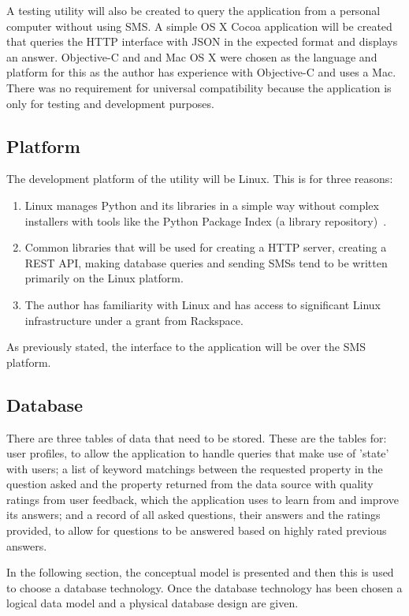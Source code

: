 \documentclass[authoryearcitations]{UoYCSproject}
\begin{document}
A testing utility will also be created to query the application from a personal computer without using SMS.  A simple OS X Cocoa application will be created that queries the HTTP interface with JSON in the expected format and displays an answer.  Objective-C and and Mac OS X were chosen as the language and platform for this as the author has experience with Objective-C and uses a Mac.  There was no requirement for universal compatibility because the application is only for testing and development purposes.

\subsection{Platform}
The development platform of the utility will be Linux.  This is for three reasons:
\begin{enumerate}
  \item Linux manages Python and its libraries in a simple way without complex installers with tools like the Python Package Index (a library repository)~\cite{pypi}.
  \item Common libraries that will be used for creating a HTTP server, creating a REST API, making database queries and sending SMSs tend to be written primarily on the Linux platform.
  \item The author has familiarity with Linux and has access to significant Linux infrastructure under a grant from Rackspace.
\end{enumerate}

As previously stated, the interface to the application will be over the SMS platform.

\subsection{Database}
There are three tables of data that need to be stored.  These are the tables for: user profiles, to allow the application to handle queries that make use of 'state' with users; a list of keyword matchings between the requested property in the question asked and the property returned from the data source with quality ratings from user feedback, which the application uses to learn from and improve its answers; and a record of all asked questions, their answers and the ratings provided, to allow for questions to be answered based on highly rated previous answers.  

In the following section, the conceptual model is presented and then this is used to choose a database technology. Once the database technology has been chosen a logical data model and a physical database design are given.
\end{document}
